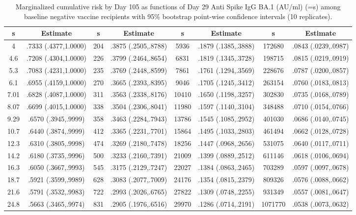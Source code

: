 \begin{longtable}{cccccccc}
\caption{Marginalized cumulative risk by Day 105 as functions of Day 29 Anti Spike IgG BA.1 (AU/ml) (=s) among baseline negative vaccine recipients with 95\% bootstrap point-wise confidence intervals (10 replicates).} \\ 
   \hline  s& Estimate& s& Estimate& s& Estimate& s& Estimate\\ 
\hline
4 & .7333 (.4377,1.0000) & 204 & .3875 (.2505,.8788) & 5936 & .1879 (.1385,.3888) & 172680 & .0843 (.0239,.0987) \\ 
  4.6 & .7208 (.4304,1.0000) & 226 & .3799 (.2464,.8654) & 6831 & .1819 (.1345,.3728) & 198715 & .0815 (.0219,.0919) \\ 
  5.3 & .7083 (.4231,1.0000) & 235 & .3769 (.2448,.8599) & 7861 & .1761 (.1294,.3569) & 228676 & .0787 (.0200,.0857) \\ 
  6.1 & .6955 (.4159,1.0000) & 270 & .3665 (.2393,.8395) & 9046 & .1705 (.1245,.3412) & 263154 & .0760 (.0183,.0813) \\ 
  7.01 & .6828 (.4087,1.0000) & 311 & .3563 (.2338,.8176) & 10410 & .1650 (.1198,.3257) & 302830 & .0735 (.0168,.0789) \\ 
  8.07 & .6699 (.4015,1.0000) & 338 & .3504 (.2306,.8041) & 11980 & .1597 (.1140,.3104) & 348488 & .0710 (.0154,.0766) \\ 
  9.29 & .6570 (.3945,.9999) & 358 & .3463 (.2284,.7943) & 13786 & .1545 (.1085,.2952) & 401030 & .0686 (.0140,.0745) \\ 
  10.7 & .6440 (.3874,.9999) & 412 & .3365 (.2231,.7701) & 15864 & .1495 (.1033,.2803) & 461494 & .0662 (.0128,.0728) \\ 
  12.3 & .6310 (.3805,.9998) & 474 & .3269 (.2180,.7478) & 18256 & .1447 (.0968,.2656) & 531075 & .0640 (.0117,.0711) \\ 
  14.2 & .6180 (.3735,.9996) & 500 & .3233 (.2160,.7391) & 21009 & .1399 (.0889,.2512) & 611146 & .0618 (.0106,.0694) \\ 
  16.3 & .6050 (.3667,.9993) & 545 & .3175 (.2129,.7247) & 22027 & .1384 (.0863,.2465) & 703289 & .0597 (.0097,.0678) \\ 
  18.7 & .5921 (.3599,.9989) & 628 & .3083 (.2077,.7009) & 24176 & .1354 (.0815,.2379) & 809326 & .0576 (.0088,.0662) \\ 
  21.6 & .5791 (.3532,.9983) & 722 & .2993 (.2026,.6765) & 27822 & .1309 (.0748,.2255) & 931349 & .0557 (.0081,.0647) \\ 
  24.8 & .5663 (.3465,.9974) & 831 & .2905 (.1976,.6516) & 29970 & .1286 (.0714,.2191) & 1071770 & .0538 (.0073,.0632) \\ 

\end{longtable}
